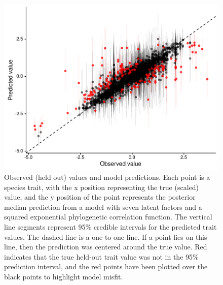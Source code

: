 \begin{figure}[ht]\centering
\includegraphics[width=\linewidth]{figs/ch5/predictions.pdf}
\caption[Observed (held out) values and model predictions]{Observed (held out) values and model predictions. Each point is a species trait, with the x position representing the true (scaled) value, and the y position of the point represents the posterior median prediction from a model with seven latent factors and a squared exponential phylogenetic correlation function. The vertical line segments represent 95\% credible intervals for the predicted trait values. The dashed line is a one to one line. If a point lies on this line, then the prediction was centered around the true value. Red indicates that the true held-out trait value was not in the 95\% prediction interval, and the red points have been plotted over the black points to highlight model misfit.}
\label{fig:predictions}
\end{figure}

